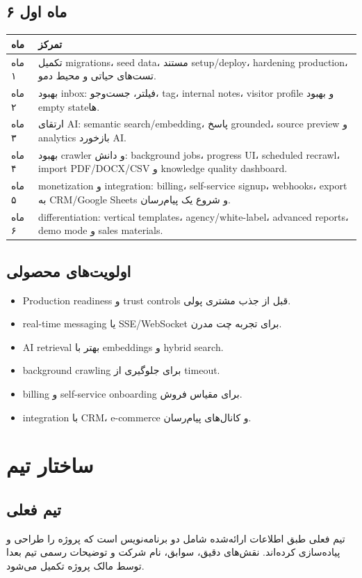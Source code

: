 \documentclass[12pt,a4paper]{article}
\begin{document}
\subsection{۶ ماه اول}
\begin{longtable}{R{28mm} R{110mm}}
\toprule
\textbf{ماه} & \textbf{تمرکز} \\
\midrule
\endhead
ماه ۱ & تکمیل migrations، seed data، مستند setup/deploy، hardening production، تست‌های حیاتی و محیط دمو. \\
ماه ۲ & بهبود inbox: فیلتر، جست‌وجو، tag، internal notes، visitor profile و بهبود empty stateها. \\
ماه ۳ & ارتقای AI: semantic search/embedding، پاسخ grounded، source preview و analytics بازخورد AI. \\
ماه ۴ & بهبود crawler و دانش: background jobs، progress UI، scheduled recrawl، import PDF/DOCX/CSV و knowledge quality dashboard. \\
ماه ۵ & monetization و integration: billing، self-service signup، webhooks، export به CRM/Google Sheets و شروع یک پیام‌رسان. \\
ماه ۶ & differentiation: vertical templates، agency/white-label، advanced reports، demo mode و sales materials. \\
\bottomrule
\end{longtable}

\subsection{اولویت‌های محصولی}
\begin{itemize}
  \item Production readiness و trust controls قبل از جذب مشتری پولی.
  \item real-time messaging یا SSE/WebSocket برای تجربه چت مدرن.
  \item AI retrieval بهتر با embeddings و hybrid search.
  \item background crawling برای جلوگیری از timeout.
  \item billing و self-service onboarding برای مقیاس فروش.
  \item integration با CRM، e-commerce و کانال‌های پیام‌رسان.
\end{itemize}

\section{ساختار تیم}
\subsection{تیم فعلی}
تیم فعلی طبق اطلاعات ارائه‌شده شامل دو برنامه‌نویس است که پروژه را طراحی و پیاده‌سازی کرده‌اند. نقش‌های دقیق، سوابق، نام شرکت و توضیحات رسمی تیم بعدا توسط مالک پروژه تکمیل می‌شود.
\end{document}
